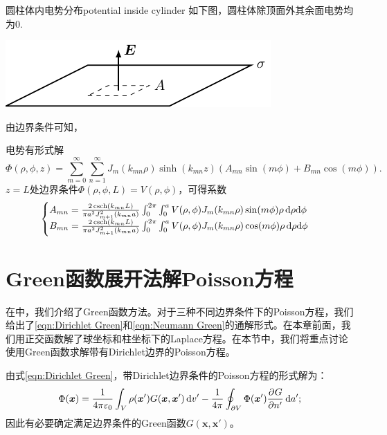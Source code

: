 \begin{example}{圆柱体内电势分布}{potential inside cylinder}
    如下图，圆柱体除顶面外其余面电势均为0.
    \begin{center}
        \includegraphics[page=15]{figures/tikz/layouts.pdf}
    \end{center}
    由边界条件可知，

    电势有形式解
    \[
        \Phi(\rho,\phi,z)=\sum_{m=0}^\infty\sum_{n=1}^\infty J_m(k_{mn}\rho)\sinh(k_{mn}z)(A_{mn}\sin(m\phi)+B_{mn}\cos(m\phi)).
    \]
    $z=L$处边界条件$\Phi(\rho,\phi,L)=V(\rho,\phi)$，可得系数
    \[
        \begin{cases}
            A_{mn}=\frac{2\operatorname{csch}(k_{mn}L)}{\pi a^2J_{m+1}^2(k_{mn}a)}\int_0^{2\pi}\int_0^aV(\rho,\phi)J_m(k_{mn}\rho)\sin(m\phi)\rho\mathop{}\!\mathrm{d}\rho\mathrm{d}\phi\\
            B_{mn}=\frac{2\operatorname{csch}(k_{mn}L)}{\pi a^2J_{m+1}^2(k_{mn}a)}\int_0^{2\pi}\int_0^aV(\rho,\phi)J_m(k_{mn}\rho)\cos(m\phi)\rho\mathop{}\!\mathrm{d}\rho\mathrm{d}\phi
        \end{cases}
    \]
\end{example}

\section{Green函数展开法解Poisson方程}
\label{sec:Green expansion solve Poisson}

在中，我们介绍了Green函数方法。对于三种不同边界条件下的Poisson方程，我们给出了\eqref{eqn:Dirichlet Green}和\eqref{eqn:Neumann Green}的通解形式。在本章前面，我们用正交函数解了球坐标和柱坐标下的Laplace方程。在本节中，我们将重点讨论使用Green函数求解带有Dirichlet边界的Poisson方程。

由式\eqref{eqn:Dirichlet Green}，带Dirichlet边界条件的Poisson方程的形式解为：
\[
    \Phi(\bm x)=\frac1{4\pi\varepsilon_0}\int_V\rho(\bm x')G(\bm x,\bm x')\mathop{}\!\mathrm{d} v'-\frac1{4\pi}\oint_{\partial V}\Phi(\bm x')\frac{\partial^{{}}G}{\partial{n'}^{{}}}\mathop{}\!\mathrm{d} a';
\]
因此有必要确定满足边界条件的Green函数$G(\bm x,\bm x')$。

